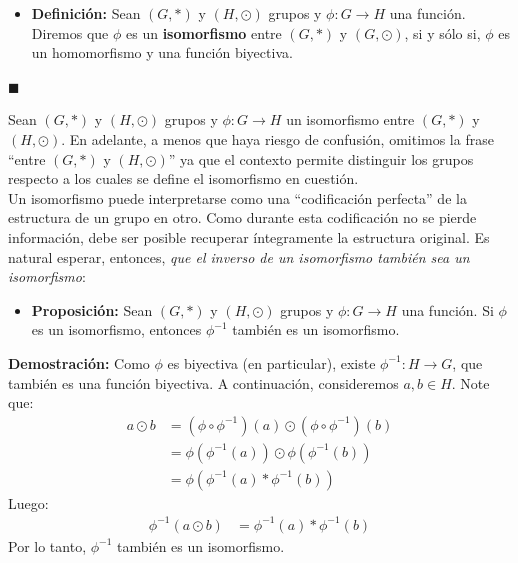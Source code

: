 \documentclass[10 pt]{article}
\begin{document}
\begin{itemize}
    \item \Large{\textbf{Definición:} Sean $(G,*)$ y $(H,\odot)$ grupos y $\phi:G \rightarrow H$ una función. Diremos que $\phi$ es un \textbf{isomorfismo} entre $(G,*)$ y $(G,\odot)$, si y sólo si, $\phi$ es un homomorfismo y una función biyectiva.} \\
\end{itemize}

\begin{flushright}
    $\blacksquare$
\end{flushright}

\Large{Sean $(G,*)$ y $(H,\odot)$ grupos y $\phi:G \rightarrow H$ un isomorfismo entre $(G,*)$ y $(H,\odot)$. En adelante, a menos que haya riesgo de confusión, omitimos la frase ``entre $(G,*)$ y $(H,\odot)$'' ya que el contexto permite distinguir los grupos respecto a los cuales se define el isomorfismo en cuestión.} \\

\Large{Un isomorfismo puede interpretarse como una ``codificación perfecta'' de la estructura de un grupo en otro. Como durante esta codificación no se pierde información, debe ser posible recuperar íntegramente la estructura original. Es natural esperar, entonces, \textit{que el inverso de un isomorfismo también sea un isomorfismo}:} \\

\begin{itemize}
    \item \Large{\textbf{Proposición:} Sean $(G,*)$ y $(H,\odot)$ grupos y $\phi:G \rightarrow H$ una función. Si $\phi$ es un isomorfismo, entonces $\phi^{-1}$ también es un isomorfismo.} \\
\end{itemize}

\Large{\textbf{Demostración:} Como $\phi$ es biyectiva (en particular), existe $\phi^{-1}:H \rightarrow G$, que también es una función biyectiva. A continuación, consideremos $a,b \in H$. Note que:}
\begin{align*}
    a \odot b&=(\phi\circ \phi^{-1})(a) \odot (\phi \circ \phi^{-1})(b) \\
    &=\phi(\phi^{-1}(a)) \odot \phi(\phi^{-1}(b)) \\
    &=\phi(\phi^{-1}(a)*\phi^{-1}(b)) 
\end{align*}
\Large{Luego:}
\begin{align*}
    \phi^{-1}(a \odot b)&=\phi^{-1}(a)*\phi^{-1}(b) 
\end{align*}
\Large{Por lo tanto, $\phi^{-1}$ también es un isomorfismo.} \\
\end{document}
